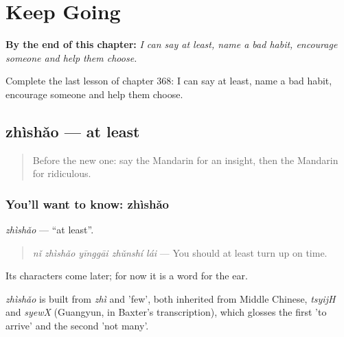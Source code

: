 
\chapter{Keep Going}
\label{ch:zh-keep-going}

\begin{chapteropening}
\textbf{By the end of this chapter:} \emph{I can say at least, name a bad habit, encourage someone and help them choose.}

Complete the last lesson of chapter 368: I can say at least, name a bad habit, encourage someone and help them choose.
\end{chapteropening}

\section[zhìshǎo]{zhìshǎo — at least}

\label{lesson:ZH-C368-zhishao}



\begin{quote}
Before the new one: say the Mandarin for an insight, then the Mandarin for ridiculous.
\end{quote}

\subsection*{You'll want to know: zhìshǎo}
\emph{zhìshǎo} — \textquotedblleft{}at least\textquotedblright{}.

\begin{quote}
\emph{nǐ zhìshǎo yīnggāi zhǔnshí lái} — You should at least turn up on time.
\end{quote}

Its characters come later; for now it is a word for the ear.

\begin{cousinweb}
\emph{zhìshǎo} is built from \emph{zhì} and  'few', both inherited from Middle Chinese, \emph{tsyijH} and \emph{syewX} (Guangyun, in Baxter's transcription), which glosses the first 'to arrive' and the second 'not many'.
\end{cousinweb}


